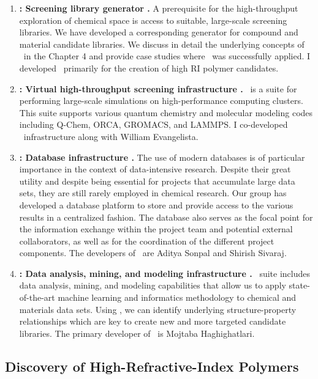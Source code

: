 \begin{enumerate}
	\item \textbf{\chemlg: Screening library generator \cite{Afzal2018b}.} A prerequisite for the high-throughput exploration of chemical space is access to suitable, large-scale screening libraries. We have developed a corresponding generator for compound and material candidate libraries. We discuss in detail the underlying concepts of \chemlg\ in the Chapter 4 and provide case studies where \chemlg\ was successfully applied. I developed \chemlg\ primarily for the creation of high RI polymer candidates.
	\item \textbf{\chemhtps: Virtual high-throughput screening infrastructure \cite{Afzal2018c}.}  \chemhtps\ is a suite for performing large-scale simulations on high-performance computing clusters. This suite supports various quantum chemistry and molecular modeling codes including Q-Chem, ORCA, GROMACS, and LAMMPS. I co-developed \chemhtps\ infrastructure along with William Evangelista. 
	\item \textbf{\chembddb: Database infrastructure \cite{Shirish2018}.} The use of modern databases is of particular importance in the context of data-intensive research. Despite their great utility and despite being essential for projects that accumulate large data sets, they are still rarely employed in chemical research. Our group has developed a database platform to store and provide access to the various results in a centralized fashion. The database also serves as the focal point for the information exchange within the project team and potential external collaborators, as well as for the coordination of the different project components. The developers of \chembddb\ are Aditya Sonpal and Shirish Sivaraj.
	\item \textbf{\chemml: Data analysis, mining, and modeling infrastructure \cite{Haghighatlari2017}.}  \chemml\ suite includes data analysis, mining, and modeling capabilities that allow us to apply state-of-the-art machine learning and informatics methodology to chemical and materials data sets. Using \chemml, we can identify underlying structure-property relationships which are key to create new and more targeted candidate libraries. The primary developer of \chemml\ is Mojtaba Haghighatlari.
	
\end{enumerate}


\subsection{Discovery of High-Refractive-Index Polymers}

